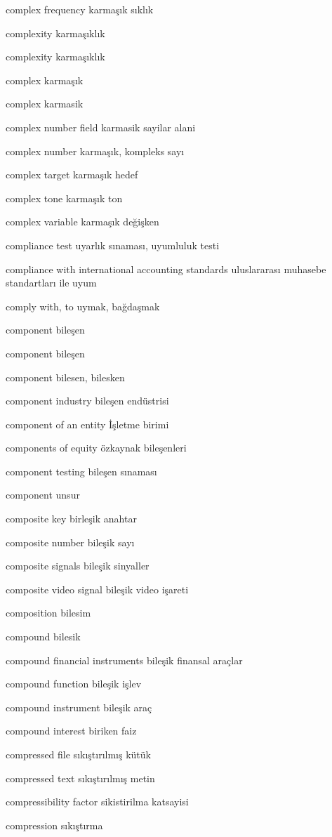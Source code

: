 \documentclass[12pt,fleqn]{article}\usepackage{../../common}
\begin{document}
complex frequency karmaşık sıklık

complexity karmaşıklık

complexity karmaşıklık

complex karmaşık

complex karmasik

complex number field karmasik sayilar alani

complex number karmaşık, kompleks sayı

complex target karmaşık hedef

complex tone karmaşık ton

complex variable karmaşık değişken

compliance test uyarlık sınaması, uyumluluk testi

compliance with international accounting standards uluslararası muhasebe standartları ile uyum

comply with, to uymak, bağdaşmak

component bileşen

component bileşen

component bilesen, bilesken

component industry bileşen endüstrisi

component of an entity İşletme birimi

components of equity özkaynak bileşenleri

component testing bileşen sınaması

component unsur

composite key birleşik anahtar

composite number bileşik sayı

composite signals bileşik sinyaller

composite video signal bileşik video işareti

composition bilesim

compound bilesik

compound financial instruments bileşik finansal araçlar

compound function bileşik işlev

compound instrument bileşik araç

compound interest biriken faiz

compressed file sıkıştırılmış kütük

compressed text sıkıştırılmış metin

compressibility factor sikistirilma katsayisi

compression sıkıştırma
\end{document}
